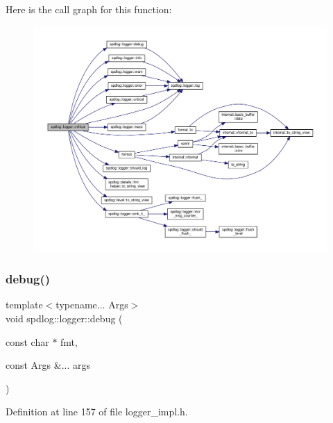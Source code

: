Here is the call graph for this function\+:
\nopagebreak
\begin{figure}[H]
\begin{center}
\leavevmode
\includegraphics[width=350pt]{classspdlog_1_1logger_a3c5140393ec153b2b8478361aac80eb6_cgraph}
\end{center}
\end{figure}
\mbox{\label{classspdlog_1_1logger_a1f60afc8308e0127c2eab2619ae352d5}} 
\subsubsection{\texorpdfstring{debug()}{debug()}\hspace{0.1cm}{\footnotesize\ttfamily [1/2]}}
{\footnotesize\ttfamily template$<$typename... Args$>$ \\
void spdlog\+::logger\+::debug (\begin{DoxyParamCaption}\item[{const char $\ast$}]{fmt,  }\item[{const Args \&...}]{args }\end{DoxyParamCaption})\hspace{0.3cm}{\ttfamily [inline]}}



Definition at line 157 of file logger\+\_\+impl.\+h.

